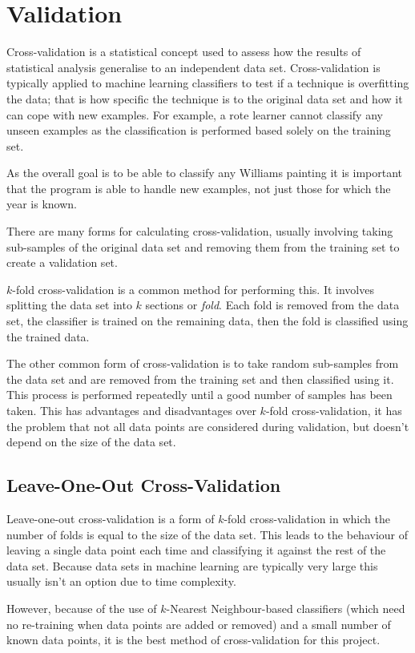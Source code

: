 \section{Validation}
Cross-validation is a statistical concept used to assess how the results of statistical analysis
generalise to an independent data set. Cross-validation is typically applied to machine learning
classifiers to test if a technique is overfitting the data; that is how specific the technique is
to the original data set and how it can cope with new examples. For example, a rote learner cannot
classify any unseen examples as the classification is performed based solely on the training set.

As the overall goal is to be able to classify any Williams painting it is important that the 
program is able to handle new examples, not just those for which the year is known.

There are many forms for calculating cross-validation, usually involving taking sub-samples of the
original data set and removing them from the training set to create a validation set.

$k$-fold cross-validation is a common method for performing this. It involves splitting the data
set into $k$ sections or \emph{fold}. Each fold is removed from the data set, the classifier is
trained on the remaining data, then the fold is classified using the trained data. 

The other common form of cross-validation is to take random sub-samples from the data set and are
removed from the training set and then classified using it. This process is performed repeatedly
until a good number of samples has been taken. This has advantages and disadvantages over $k$-fold
cross-validation, it has the problem that not all data points are considered during validation,
but doesn't depend on the size of the data set.


\subsection{Leave-One-Out Cross-Validation}
Leave-one-out cross-validation is a form of $k$-fold cross-validation in which the number of folds
is equal to the size of the data set. This leads to the behaviour of leaving a single data point
each time and classifying it against the rest of the data set. Because data sets in machine 
learning are typically very large this usually isn't an option due to time complexity.

However, because of the use of $k$-Nearest Neighbour-based classifiers (which need no re-training 
when data points are added or removed) and a small number of known data points, it is the best 
method of cross-validation for this project.

